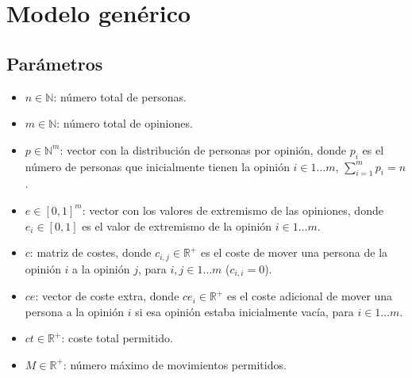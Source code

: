 




\maketitle


\tableofcontents

\clearpage



\section{Modelo genérico}

\subsection{Parámetros}

\begin{itemize}
	\item $n \in \mathbb{ N }$: número total de personas.

	\item $m \in \mathbb{ N }$: número total de opiniones.

	\item $p \in \mathbb{ N }^m$: vector con la distribución de personas por opinión, donde $p_i$ es el número de personas que inicialmente tienen la opinión $i \in 1\dots m$, $\sum_{ i = 1 }^m p_i = n$.

	\item $e \in [0,1]^m$: vector con los valores de extremismo de las opiniones, donde $e_i \in [0,1]$ es el valor de extremismo de la opinión $i \in 1 \dots m$.

	\item $c$: matriz de costes, donde $c_{ i,j } \in \mathbb{ R }^+$ es el coste de mover una persona de la opinión $i$ a la opinión $j$, para $i,j \in 1 \dots m$ ($c_{ i,i } = 0$).

	\item $ce$: vector de coste extra, donde $ce_i \in \mathbb{ R }^+$ es el coste adicional de mover una persona a la opinión $i$ si esa opinión estaba inicialmente vacía, para $i \in 1 \dots m$.

	\item $ct \in \mathbb{ R }^+$: coste total permitido.

	\item $M \in \mathbb{ R }^+$: número máximo de movimientos permitidos.
\end{itemize}

